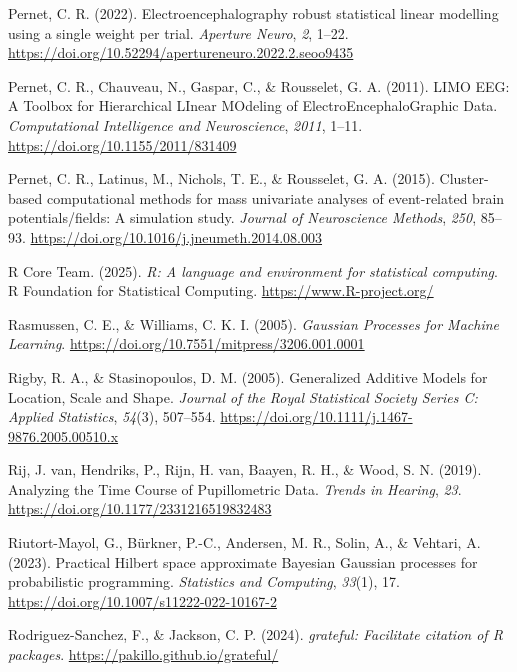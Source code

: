 \documentclass[
  doc,
  floatsintext,
  longtable,
  a4paper,
  nolmodern,
  notxfonts,
  notimes,
  donotrepeattitle,
  colorlinks=true,linkcolor=blue,citecolor=blue,urlcolor=blue]{apa7}
\newlength{\cslhangindent}
\newenvironment{CSLReferences}[2] %
 {\begin{list}{}{%
  \setlength{\itemindent}{0pt}
  \setlength{\leftmargin}{0pt}
  \setlength{\parsep}{0pt}
  \ifodd #1
   \setlength{\leftmargin}{\cslhangindent}
   \setlength{\itemindent}{-1\cslhangindent}
  \fi
  \setlength{\itemsep}{#2\baselineskip}}}
 {\end{list}}
\begin{document}
\begin{CSLReferences}{1}{0}
Pernet, C. R. (2022). Electroencephalography robust statistical linear
modelling using a single weight per trial. \emph{Aperture Neuro},
\emph{2}, 1--22.
\url{https://doi.org/10.52294/apertureneuro.2022.2.seoo9435}

Pernet, C. R., Chauveau, N., Gaspar, C., \& Rousselet, G. A. (2011).
LIMO EEG: A Toolbox for Hierarchical LInear MOdeling of
ElectroEncephaloGraphic Data. \emph{Computational Intelligence and
Neuroscience}, \emph{2011}, 1--11.
\url{https://doi.org/10.1155/2011/831409}

Pernet, C. R., Latinus, M., Nichols, T. E., \& Rousselet, G. A. (2015).
Cluster-based computational methods for mass univariate analyses of
event-related brain potentials/fields: A simulation study. \emph{Journal
of Neuroscience Methods}, \emph{250}, 85--93.
\url{https://doi.org/10.1016/j.jneumeth.2014.08.003}

R Core Team. (2025). \emph{{R}: A language and environment for
statistical computing}. R Foundation for Statistical Computing.
\url{https://www.R-project.org/}

Rasmussen, C. E., \& Williams, C. K. I. (2005). \emph{Gaussian Processes
for Machine Learning}.
\url{https://doi.org/10.7551/mitpress/3206.001.0001}

Rigby, R. A., \& Stasinopoulos, D. M. (2005). Generalized Additive
Models for Location, Scale and Shape. \emph{Journal of the Royal
Statistical Society Series C: Applied Statistics}, \emph{54}(3),
507--554. \url{https://doi.org/10.1111/j.1467-9876.2005.00510.x}

Rij, J. van, Hendriks, P., Rijn, H. van, Baayen, R. H., \& Wood, S. N.
(2019). Analyzing the Time Course of Pupillometric Data. \emph{Trends in
Hearing}, \emph{23}. \url{https://doi.org/10.1177/2331216519832483}

Riutort-Mayol, G., Bürkner, P.-C., Andersen, M. R., Solin, A., \&
Vehtari, A. (2023). Practical {Hilbert} space approximate {Bayesian
Gaussian} processes for probabilistic programming. \emph{Statistics and
Computing}, \emph{33}(1), 17.
\url{https://doi.org/10.1007/s11222-022-10167-2}

Rodriguez-Sanchez, F., \& Jackson, C. P. (2024). \emph{{grateful}:
Facilitate citation of {R} packages}.
\url{https://pakillo.github.io/grateful/}


\end{CSLReferences}
\end{document}
